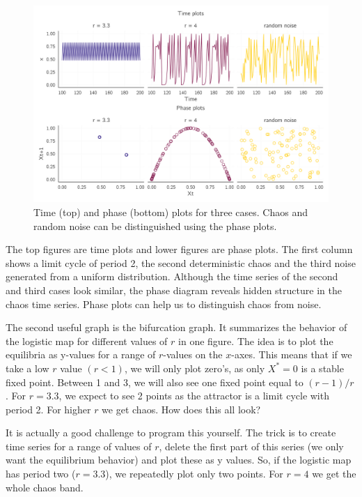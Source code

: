 \documentclass[
  a4paper,
  DIV=11,
  numbers=noendperiod,
  oneside]{scrreprt}
\begin{document}
\begin{figure}

{\centering \includegraphics{media/ch2/fig-ch2-img7.jpg}

}

\caption{\label{fig-ch2-img7}Time (top) and phase (bottom) plots for
three cases. Chaos and random noise can be distinguished using the phase
plots.}

\end{figure}

The top figures are time plots and lower figures are phase plots. The
first column shows a limit cycle of period 2, the second deterministic
chaos and the third noise generated from a uniform distribution.
Although the time series of the second and third cases look similar, the
phase diagram reveals hidden structure in the chaos time series. Phase
plots can help us to distinguish chaos from noise.

The second useful graph is the bifurcation graph. It summarizes the
behavior of the logistic map for different values of \(r\) in one
figure. The idea is to plot the equilibria as y-values for a range of
\(r\)-values on the \(x\)-axes. This means that if we take a low \(r\)
value \((r < 1)\), we will only plot zero's, as only \(X^{*} = 0\) is a
stable fixed point. Between 1 and 3, we will also see one fixed point
equal to \((r - 1)/r\). For \(r = 3.3\), we expect to see 2 points as
the attractor is a limit cycle with period 2. For higher \(r\) we get
chaos. How does this all look?

It is actually a good challenge to program this yourself. The trick is
to create time series for a range of values of \(r\), delete the first
part of this series (we only want the equilibrium behavior) and plot
these as y values. So, if the logistic map has period two (\(r = 3.3\)),
we repeatedly plot only two points. For \(r = 4\) we get the whole chaos
band.
\end{document}
